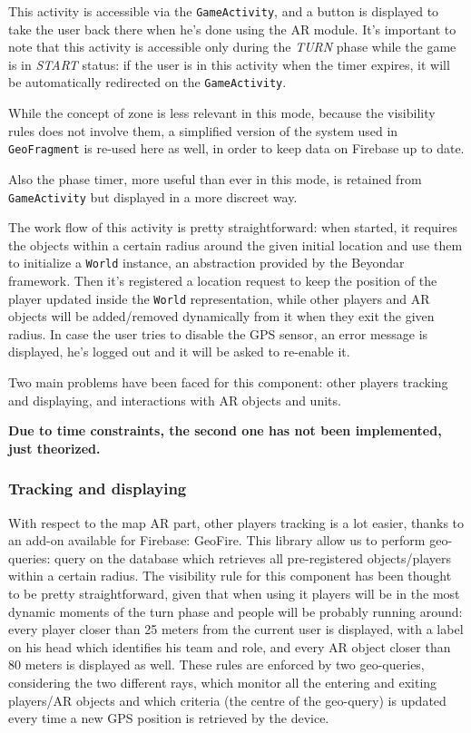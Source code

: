 		This activity is accessible via the \lstinline|GameActivity|, and a button is displayed to take the user back there when he's done using the AR module.
		It's important to note that this activity is accessible only during the \emph{TURN} phase while the game is in \emph{START} status: if the user is in this activity when the timer expires, it will be automatically redirected on the \lstinline|GameActivity|.
		
		While the concept of zone is less relevant in this mode, because the visibility rules does not involve them, a simplified version of the system used in \lstinline|GeoFragment| is re-used here as well, in order to keep data on Firebase up to date.
		
		Also the phase timer, more useful than ever in this mode, is retained from \lstinline|GameActivity| but displayed in a more discreet way.
		
		The work flow of this activity is pretty straightforward: when started, it requires the objects within a certain radius around the given initial location and use them to initialize a \lstinline|World| instance, an abstraction provided by the Beyondar framework.
		Then it's registered a location request to keep the position of the player updated inside the \lstinline|World| representation, while other players and AR objects will be added/removed dynamically from it when they exit the given radius. In case the user tries to disable the GPS sensor, an error message is displayed, he's logged out and it will be asked to re-enable it.
		
		Two main problems have been faced for this component: other players tracking and displaying, and interactions with AR objects and units.
		
		\textbf{Due to time constraints, the second one has not been implemented, just theorized.} 
			
			\subsubsection{Tracking and displaying}
			
			With respect to the map AR part, other players tracking is a lot easier, thanks to an add-on available for Firebase: GeoFire.
			This library allow us to perform geo-queries: query on the database which retrieves all pre-registered objects/players within a certain radius.
			The visibility rule for this component has been thought to be pretty straightforward, given that when using it players will be in the most dynamic moments of the turn phase and people will be probably running around: every player closer than 25 meters from the current user is displayed, with a label on his head which identifies his team and role, and every AR object closer than 80 meters is displayed as well.
			These rules are enforced by two geo-queries, considering the two different rays, which monitor all the entering and exiting players/AR objects and which criteria (the centre of the geo-query) is updated every time a new GPS position is retrieved by the device.
			
